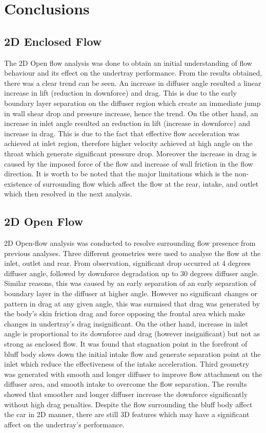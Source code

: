 \newpage
\section{Conclusions}
\justifying
\subsection*{2D Enclosed Flow}
The 2D Open flow analysis was done to obtain an initial understanding of flow behaviour and its effect on the undertray performance. From the results obtained, there was a clear trend can be seen. An increase in diffuser angle resulted a linear increase in lift (reduction in downforce) and drag. This is due to the early boundary layer separation on the diffuser region which create an immediate jump in wall shear drop and pressure increase, hence the trend. On the other hand, an increase in inlet angle resulted an reduction in lift (increase in downforce) and increase in drag. This is due to the fact that effective flow acceleration was achieved at inlet region, therefore higher velocity achieved at high angle on the throat which generate significant pressure drop. Moreover the increase in drag is caused by the imposed force of the flow and increase of wall friction in the flow direction. It is worth to be noted that the major limitations which is the non-existence of surrounding flow which affect the flow at the rear, intake, and outlet which then resolved in the next analysis.


\subsection*{2D Open Flow}
2D Open-flow analysis was conducted to resolve surrounding flow presence from previous analyses. Three different geometries were used to analyse the flow at the inlet, outlet and rear. From observation, significant drop occurred at 4 degrees diffuser angle, followed by downforce degradation up to 30 degrees diffuser angle. Similar reasons, this was caused by an early separation of an early separation of boundary layer in the diffuser at higher angle. However no significant changes or pattern in drag at any given angle, this was surmised that drag was generated by the body's skin friction drag and force opposing the frontal area which make changes in undertray's drag insignificant. On the other hand, increase in inlet angle is proportional to its downforce and drag (however insignificant) but not as strong as enclosed flow. It was found that stagnation point in the forefront of bluff body slows down the initial intake flow and generate separation point at the inlet which reduce the effectiveness of the intake acceleration. Third geometry was generated with smooth and longer diffuser to improve flow attachment on the diffuser area, and smooth intake to overcome the flow separation. The results showed that smoother and longer diffuser increase the downforce significantly without high drag penalties. Despite the flow surrounding the bluff body affect the car in 2D manner, there are still 3D features which may have a significant affect on the undertray's performance.

